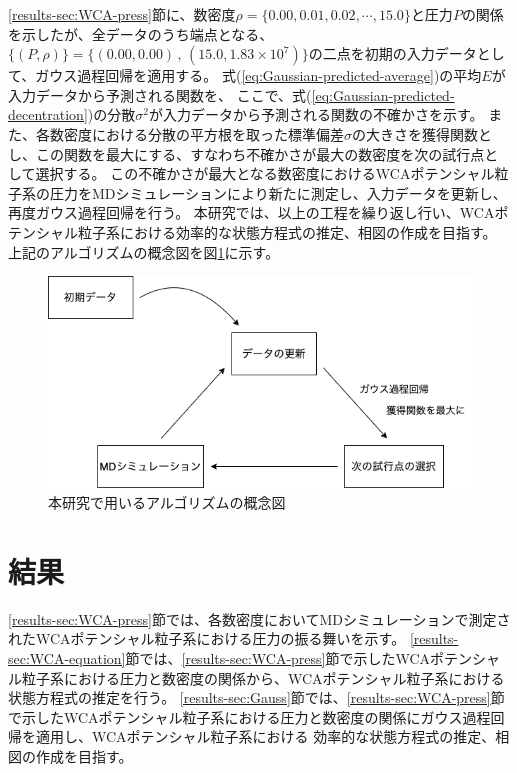 \documentclass[titlepage]{jsreport}
\begin{document}
{{{\ref{results-sec:WCA-press}節に、数密度$\rho=\{0.00,0.01,0.02,\cdots,15.0\}$と圧力$P$の関係を示したが、全データのうち端点となる、
$\{(P,\rho)\}=\{(0.00,0.00)\,,\,(15.0,1.83×10^7)\}$の二点を初期の入力データとして、ガウス過程回帰を適用する。
式(\ref{eq:Gaussian-predicted-average})の平均$E$が入力データから予測される関数を、
ここで、式(\ref{eq:Gaussian-predicted-decentration})の分散$\sigma^2$が入力データから予測される関数の不確かさを示す。
また、各数密度における分散の平方根を取った標準偏差$\sigma$の大きさを獲得関数とし、この関数を最大にする、すなわち不確かさが最大の数密度を次の試行点として選択する。
この不確かさが最大となる数密度におけるWCAポテンシャル粒子系の圧力をMDシミュレーションにより新たに測定し、入力データを更新し、再度ガウス過程回帰を行う。
本研究では、以上の工程を繰り返し行い、WCAポテンシャル粒子系における効率的な状態方程式の推定、相図の作成を目指す。
上記のアルゴリズムの概念図を図\ref{fig:algorithm}に示す。

\begin{figure}[htbp]
    \begin{center}
        \includegraphics[width=14cm]{fig/algorithm.png}
    \end{center}
    \caption{本研究で用いるアルゴリズムの概念図}
    \label{fig:algorithm}
\end{figure}

\chapter{結果} \label{chap:results}
\ref{results-sec:WCA-press}節では、各数密度においてMDシミュレーションで測定されたWCAポテンシャル粒子系における圧力の振る舞いを示す。
\ref{results-sec:WCA-equation}節では、\ref{results-sec:WCA-press}節で示したWCAポテンシャル粒子系における圧力と数密度の関係から、WCAポテンシャル粒子系における状態方程式の推定を行う。
\ref{results-sec:Gauss}節では、\ref{results-sec:WCA-press}節で示したWCAポテンシャル粒子系における圧力と数密度の関係にガウス過程回帰を適用し、WCAポテンシャル粒子系における
効率的な状態方程式の推定、相図の作成を目指す。


}}}
\end{document}

